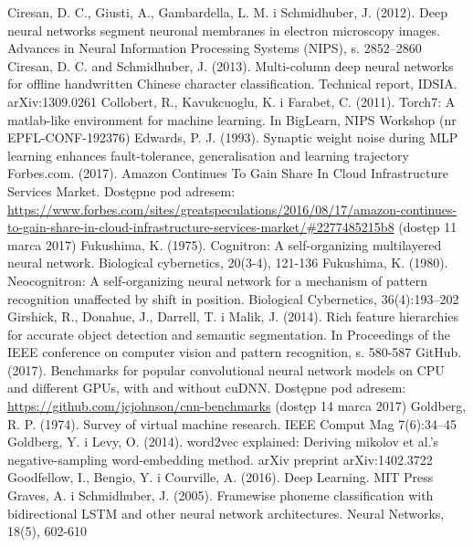 \documentclass[12pt,a4paper,twoside]{article}
\begin{document}
\begin{thebibliography}{99}
 Ciresan, D. C., Giusti, A., Gambardella, L. M. i Schmidhuber, J. (2012). Deep neural networks segment neuronal membranes in electron microscopy images. Advances in Neural Information Processing Systems (NIPS), s. 2852–2860
 Ciresan, D. C. and Schmidhuber, J. (2013). Multi-column deep neural networks for offline handwritten Chinese character classification. Technical report, IDSIA. arXiv:1309.0261
 Collobert, R., Kavukcuoglu, K. i Farabet, C. (2011). Torch7: A matlab-like environment for machine learning. In BigLearn, NIPS Workshop (nr EPFL-CONF-192376)
 Edwards, P. J. (1993). Synaptic weight noise during MLP learning enhances fault-tolerance, generalisation and learning trajectory
 Forbes.com. (2017). Amazon Continues To Gain Share In Cloud Infrastructure Services Market. Dostępne pod adresem: \url{https://www.forbes.com/sites/greatspeculations/2016/08/17/amazon-continues-to-gain-share-in-cloud-infrastructure-services-market/#2277485215b8} (dostęp 11 marca 2017)
 Fukushima, K. (1975). Cognitron: A self-organizing multilayered neural network. Biological cybernetics, 20(3-4), 121-136
 Fukushima, K. (1980). Neocognitron: A self-organizing neural network for a mechanism of pattern recognition unaffected by shift in position. Biological Cybernetics, 36(4):193–202
 Girshick, R., Donahue, J., Darrell, T. i Malik, J. (2014). Rich feature hierarchies for accurate object detection and semantic segmentation. In Proceedings of the IEEE conference on computer vision and pattern recognition, s. 580-587
 GitHub. (2017). Benchmarks for popular convolutional neural network models on CPU and different GPUs, with and without cuDNN. Dostępne pod adresem: \url{https://github.com/jcjohnson/cnn-benchmarks} (dostęp 14 marca 2017)
 Goldberg, R. P. (1974). Survey of virtual machine research. IEEE Comput Mag 7(6):34–45
 Goldberg, Y. i Levy, O. (2014). word2vec explained: Deriving mikolov et al.'s negative-sampling word-embedding method. arXiv preprint arXiv:1402.3722
 Goodfellow, I., Bengio, Y. i Courville, A. (2016). Deep Learning. MIT Press
 Graves, A. i Schmidhuber, J. (2005). Framewise phoneme classification with bidirectional LSTM and other neural network architectures. Neural Networks, 18(5), 602-610

\end{thebibliography}
\end{document}
